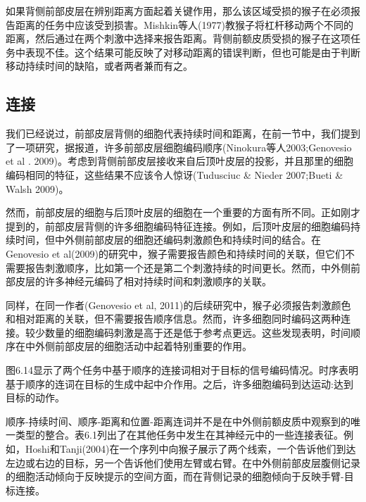 如果背侧前部皮层在辨别距离方面起着关键作用，那么该区域受损的猴子在必须报告距离的任务中应该受到损害。Mishkin等人(1977)教猴子将杠杆移动两个不同的距离，然后通过在两个刺激中选择来报告距离。背侧前额皮质受损的猴子在这项任务中表现不佳。这个结果可能反映了对移动距离的错误判断，但也可能是由于判断移动持续时间的缺陷，或者两者兼而有之。

\subsection{连接}
我们已经说过，前部皮层背侧的细胞代表持续时间和距离，在前一节中，我们提到了一项研究，据报道，许多前部皮层细胞编码顺序(Ninokura等人2003;Genovesio et al . 2009)。考虑到背侧前部皮层接收来自后顶叶皮层的投影，并且那里的细胞编码相同的特征，这些结果不应该令人惊讶(Tudusciuc \& Nieder 2007;Bueti \& Walsh 2009)。

然而，前部皮层的细胞与后顶叶皮层的细胞在一个重要的方面有所不同。正如刚才提到的，前部皮层背侧的许多细胞编码特征连接。例如，后顶叶皮层的细胞编码持续时间，但中外侧前部皮层的细胞还编码刺激颜色和持续时间的结合。在Genovesio et al(2009)的研究中，猴子需要报告颜色和持续时间的关联，但它们不需要报告刺激顺序，比如第一个还是第二个刺激持续的时间更长。然而，中外侧前部皮层的许多神经元编码了相对持续时间和刺激顺序的关联。

同样，在同一作者(Genovesio et al, 2011)的后续研究中，猴子必须报告刺激颜色和相对距离的关联，但不需要报告顺序信息。然而，许多细胞同时编码这两种连接。较少数量的细胞编码刺激是高于还是低于参考点更远。这些发现表明，时间顺序在中外侧前部皮层的细胞活动中起着特别重要的作用。

图6.14显示了两个任务中基于顺序的连接词相对于目标的信号编码情况。时序表明基于顺序的连词在目标的生成中起中介作用。之后，许多细胞编码到达运动:达到目标的动作。

顺序-持续时间、顺序-距离和位置-距离连词并不是在中外侧前额皮质中观察到的唯一类型的整合。表6.1列出了在其他任务中发生在其神经元中的一些连接表征。例如，Hoshi和Tanji(2004)在一个序列中向猴子展示了两个线索，一个告诉他们到达左边或右边的目标，另一个告诉他们使用左臂或右臂。在中外侧前部皮层腹侧记录的细胞活动倾向于反映提示的空间方面，而在背侧记录的细胞倾向于反映手臂-目标连接。

